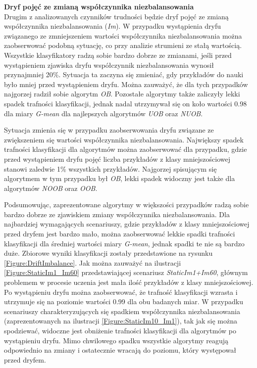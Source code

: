 \noindent \textbf{Dryf pojęć ze zmianą współczynnika niezbalansowania}\\

\noindent Drugim z analizowanych czynników trudności będzie dryf pojęć ze zmianą współczynnika niezbalansowania (\textit{Im}). W przypadku wystąpienia dryfu związanego ze zmniejszeniem wartości współczynnika niezbalansowania można zaobserwować podobną sytuację, co przy analizie strumieni ze stałą wartością. Wszystkie klasyfikatory radzą sobie bardzo dobrze ze zmianami, jeśli przed wystąpieniem zjawiska dryfu współczynnik niezbalansowania wynosił przynajmniej 20\%. Sytuacja ta zaczyna się zmieniać, gdy przykładów do nauki było mniej przed wystąpieniem dryfu. Można zauważyć, że dla tych przypadków najgorzej radził sobie algorytm \textit{OB}. Pozostałe algorytmy także zaliczyły lekki spadek trafności klasyfikacji, jednak nadal utrzymywał się on koło wartości 0.98 dla miary \textit{G-mean} dla najlepszych algorytmów \textit{UOB} oraz \textit{NUOB}.

Sytuacja zmienia się w przypadku zaobserwowania dryfu związane ze zwiększeniem się wartości współczynnika niezbalansowania. Największy spadek trafności klasyfikacji dla algorytmów można zaobserwować dla przypadku, gdzie przed wystąpieniem dryfu pojęć liczba przykładów z klasy mniejszościowej stanowi zaledwie 1\% wszystkich przykładów. Najgorzej spisującym się algorytmem w tym przypadku był \textit{OB}, lekki spadek widoczny jest także dla algorytmów \textit{NOOB} oraz \textit{OOB}.

Podsumowując, zaprezentowane algorytmy w większości przypadków radzą sobie bardzo dobrze ze zjawiskiem zmiany współczynnika niezbalansowania. Dla najbardziej wymagających scenariuszy, gdzie przykładów z klasy mniejszościowej przed dryfem jest bardzo mało, można zaobserwować lekkie spadki trafności klasyfikacji dla średniej wartości miary \textit{G-mean}, jednak spadki te nie są bardzo duże. Zbiorowe wyniki klasyfikacji zostały przedstawione na rysunku \ref{Figure:DriftImbalance}. Jak można zauważyć na ilustracji \ref{Figure:StaticIm1_Im60} przedstawiającej scenariusz \textit{StaticIm1+Im60}, głównym problemem w procesie uczenia jest mała ilość przykładów z klasy mniejszościowej. Po wystąpieniu dryfu można zaobserwować, że trafność klasyfikacji wzrasta i utrzymuje się na poziomie wartości 0.99 dla obu badanych miar. W przypadku scenariuszy charakteryzujących się spadkiem współczynnika niezbalansowania (zaprezentowanych na ilustracji \ref{Figure:StaticIm10_Im1}), tak jak się można  spodziewać, widoczne jest obniżenie trafności klasyfikacji dla algorytmów po wystąpieniu dryfu. Mimo chwilowego spadku wszystkie algorytmy reagują odpowiednio na zmiany i ostatecznie wracają do poziomu, który występował przed dryfem.

